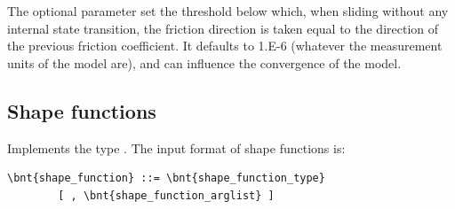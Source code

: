 \begin{enumerate}
    The optional parameter  set the threshold below which, when sliding without any internal state transition, the friction direction is taken
    equal to the direction of the previous friction coefficient. It defaults to 1.E-6 
    (whatever the measurement units of the model are), and can influence the convergence of the model.
\end{enumerate}

\subsection{Shape functions}
\label{sec:shape function}
Implements the type .
The input format of shape functions is:
\begin{Verbatim}[commandchars=\\\{\}]
    \bnt{shape_function} ::= \bnt{shape_function_type}
        [ , \bnt{shape_function_arglist} ]
\end{Verbatim}
